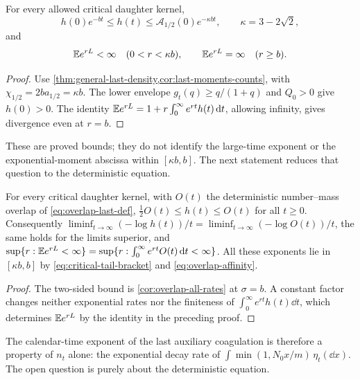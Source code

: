 \begin{corollary}
\label{cor:critical-moment-bracket}
For every allowed critical daughter kernel,
\begin{equation}
 h(0)e^{-bt}\leq h(t)\leq
       \mathcal A_{1/2}(0)e^{-\kappa bt},\qquad
       \kappa=3-2\sqrt2,
 \label{eq:critical-tail-bracket}
\end{equation}
and
\begin{equation}
 \mathbb E e^{rL}<\infty\quad(0<r<\kappa b),\qquad
 \mathbb E e^{rL}=\infty\quad(r\geq b).
 \label{eq:critical-exp-bracket}
\end{equation}
\end{corollary}

\begin{proof}
Use \cref{thm:general-last-density,cor:last-moments-counts}, with
$\chi_{1/2}=2ba_{1/2}=\kappa b$. The lower envelope
$g_t(q)\geq q/(1+q)$ and $Q_0>0$ give $h(0)>0$. The identity
$\mathbb E e^{rL}=1+r\int_0^\infty e^{rt}h(t)\,\mathrm d t$, allowing infinity, gives
divergence even at $r=b$.
\end{proof}

These are proved bounds; they do not identify the large-time exponent
or the exponential-moment abscissa within $[\kappa b,b]$. The next
statement reduces that question to the deterministic equation.

\begin{proposition}
\label{prop:overlap-reduction}
For every critical daughter kernel, with $O(t)$ the deterministic
number--mass overlap of \eqref{eq:overlap-last-def},
$\tfrac12O(t)\leq h(t)\leq O(t)$ for all $t\geq0$. Consequently
$\liminf_{t\to\infty}(-\log h(t))/t=\liminf_{t\to\infty}(-\log O(t))/t$,
the same holds for the limits superior, and
$\sup\{r:\mathbb E e^{rL}<\infty\}=\sup\{r:\int_0^\infty e^{rt}O(t)\,\mathrm d t<\infty\}$.
All these exponents lie in $[\kappa b,b]$ by
\eqref{eq:critical-tail-bracket} and \eqref{eq:overlap-affinity}.
\end{proposition}

\begin{proof}
The two-sided bound is \cref{cor:overlap-all-rates} at $\sigma=b$. A
constant factor changes neither exponential rates nor the finiteness
of $\int_0^\infty e^{rt}h(t)\dd t$, which determines $\mathbb E e^{rL}$ by
the identity in the preceding proof.
\end{proof}

The calendar-time exponent of the last auxiliary coagulation is
therefore a property of $n_t$ alone: the exponential decay rate of
$\int\min(1,N_0x/m)\,\eta_t(\dd x)$. The open question is purely
about the deterministic equation.

